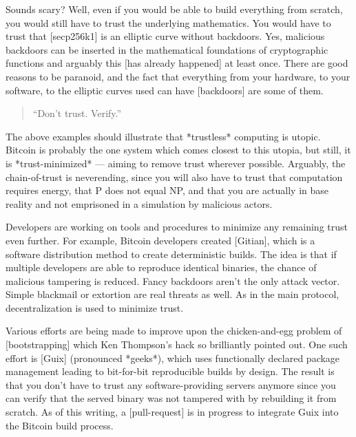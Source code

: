 
Sounds scary? Well, even if you would be able to build everything from
scratch, you would still have to trust the underlying mathematics. You
would have to trust that [secp256k1] is an elliptic curve without
backdoors. Yes, malicious backdoors can be inserted in the mathematical
foundations of cryptographic functions and arguably this [has already
happened] at least once. There are good reasons to be paranoid, and the
fact that everything from your hardware, to your software, to the
elliptic curves used can have [backdoors] are some of them.

\begin{quotation}
``Don't trust. Verify.''
\end{quotation}

The above examples should illustrate that *trustless* computing is
utopic. Bitcoin is probably the one system which comes closest to this
utopia, but still, it is *trust-minimized* --- aiming to remove trust
wherever possible. Arguably, the chain-of-trust is neverending, since
you will also have to trust that computation requires energy, that P
does not equal NP, and that you are actually in base reality and not
emprisoned in a simulation by malicious actors.

Developers are working on tools and procedures to minimize any remaining
trust even further. For example, Bitcoin developers created [Gitian],
which is a software distribution method to create deterministic builds.
The idea is that if multiple developers are able to reproduce identical
binaries, the chance of malicious tampering is reduced. Fancy backdoors
aren't the only attack vector. Simple blackmail or extortion are real
threats as well. As in the main protocol, decentralization is used to
minimize trust.

Various efforts are being made to improve upon the chicken-and-egg
problem of [bootstrapping] which Ken Thompson's hack so brilliantly
pointed out. One such effort is [Guix] (pronounced *geeks*), which uses
functionally declared package management leading to bit-for-bit
reproducible builds by design. The result is that you don't have to
trust any software-providing servers anymore since you can verify that
the served binary was not tampered with by rebuilding it from scratch.
As of this writing, a [pull-request] is in progress to integrate Guix
into the Bitcoin build process.


